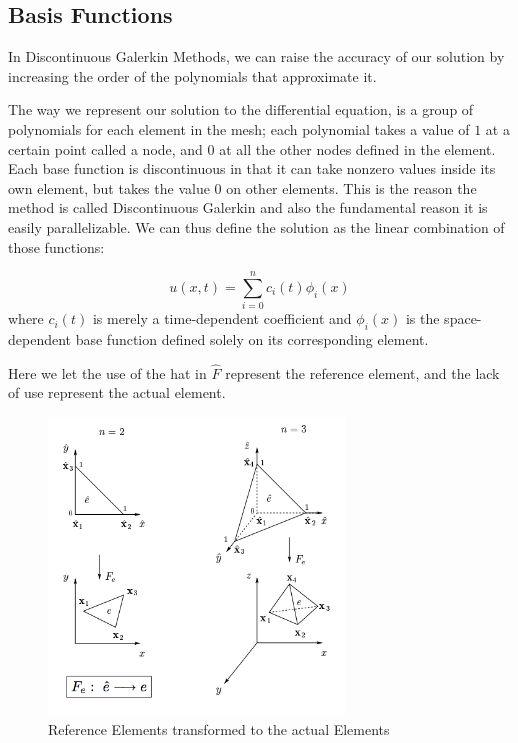 \subsection{Basis Functions}

In Discontinuous Galerkin Methods, we can raise the accuracy of our solution by increasing the order of the polynomials that approximate it. 

The way we represent our solution to the differential equation, is a group of polynomials for each element in the mesh; each polynomial takes a value of $1$ at a certain point called a node, and $0$ at all the other nodes defined in the element. Each base function is discontinuous in that it can take nonzero values inside its own element, but takes the value $0$ on other elements. This is the reason the method is called Discontinuous Galerkin and also the fundamental reason it is easily parallelizable. We can thus define the solution as the linear combination of those functions:

$$u(x,t) = \sum\limits_{i=0}^n c_i(t)\phi_i(x)$$ 
where $c_i(t)$ is merely a time-dependent coefficient and $\phi_i(x)$ is the space-dependent base function defined solely on its corresponding element.


Here we let the use of the hat in $\hat{F}$ represent the reference element, and the lack of use represent the actual element.


\begin{figure}[ht]
	\centering
	\includegraphics[width=0.7\textwidth]{Images/Reference-Elements.png}
	\caption{Reference Elements transformed to the actual Elements}
	\label{fig:Reference-Elements}
\end{figure}


